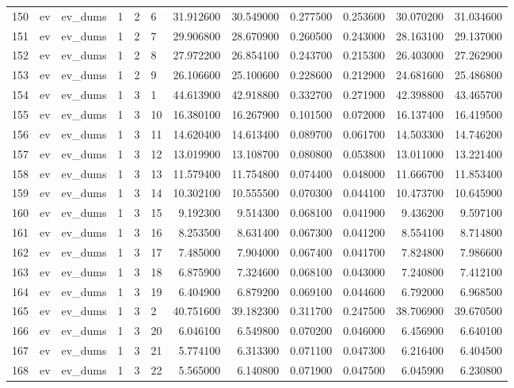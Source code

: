 \begin{tabular}{llllllrrrrrr}
150 & ev & ev_dums & 1 & 2 & 6 & 31.912600 & 30.549000 & 0.277500 & 0.253600 & 30.070200 & 31.034600 \\
151 & ev & ev_dums & 1 & 2 & 7 & 29.906800 & 28.670900 & 0.260500 & 0.243000 & 28.163100 & 29.137000 \\
152 & ev & ev_dums & 1 & 2 & 8 & 27.972200 & 26.854100 & 0.243700 & 0.215300 & 26.403000 & 27.262900 \\
153 & ev & ev_dums & 1 & 2 & 9 & 26.106600 & 25.100600 & 0.228600 & 0.212900 & 24.681600 & 25.486800 \\
154 & ev & ev_dums & 1 & 3 & 1 & 44.613900 & 42.918800 & 0.332700 & 0.271900 & 42.398800 & 43.465700 \\
155 & ev & ev_dums & 1 & 3 & 10 & 16.380100 & 16.267900 & 0.101500 & 0.072000 & 16.137400 & 16.419500 \\
156 & ev & ev_dums & 1 & 3 & 11 & 14.620400 & 14.613400 & 0.089700 & 0.061700 & 14.503300 & 14.746200 \\
157 & ev & ev_dums & 1 & 3 & 12 & 13.019900 & 13.108700 & 0.080800 & 0.053800 & 13.011000 & 13.221400 \\
158 & ev & ev_dums & 1 & 3 & 13 & 11.579400 & 11.754800 & 0.074400 & 0.048000 & 11.666700 & 11.853400 \\
159 & ev & ev_dums & 1 & 3 & 14 & 10.302100 & 10.555500 & 0.070300 & 0.044100 & 10.473700 & 10.645900 \\
160 & ev & ev_dums & 1 & 3 & 15 & 9.192300 & 9.514300 & 0.068100 & 0.041900 & 9.436200 & 9.597100 \\
161 & ev & ev_dums & 1 & 3 & 16 & 8.253500 & 8.631400 & 0.067300 & 0.041200 & 8.554100 & 8.714800 \\
162 & ev & ev_dums & 1 & 3 & 17 & 7.485000 & 7.904000 & 0.067400 & 0.041700 & 7.824800 & 7.986600 \\
163 & ev & ev_dums & 1 & 3 & 18 & 6.875900 & 7.324600 & 0.068100 & 0.043000 & 7.240800 & 7.412100 \\
164 & ev & ev_dums & 1 & 3 & 19 & 6.404900 & 6.879200 & 0.069100 & 0.044600 & 6.792000 & 6.968500 \\
165 & ev & ev_dums & 1 & 3 & 2 & 40.751600 & 39.182300 & 0.311700 & 0.247500 & 38.706900 & 39.670500 \\
166 & ev & ev_dums & 1 & 3 & 20 & 6.046100 & 6.549800 & 0.070200 & 0.046000 & 6.456900 & 6.640100 \\
167 & ev & ev_dums & 1 & 3 & 21 & 5.774100 & 6.313300 & 0.071100 & 0.047300 & 6.216400 & 6.404500 \\
168 & ev & ev_dums & 1 & 3 & 22 & 5.565000 & 6.140800 & 0.071900 & 0.047500 & 6.045900 & 6.230800 \\

\end{tabular}
